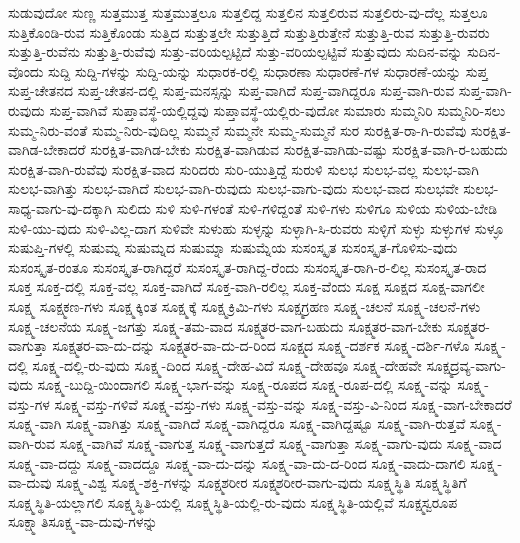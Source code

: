 {ಸುಡುವುದೋ
ಸುಣ್ಣ
ಸುತ್ತಮುತ್ತ
ಸುತ್ತಮುತ್ತಲೂ
ಸುತ್ತಲಿದ್ದ
ಸುತ್ತಲಿನ
ಸುತ್ತಲಿರುವ
ಸುತ್ತಲಿರು-ವು-ದೆಲ್ಲ
ಸುತ್ತಲೂ
ಸುತ್ತಿಕೊಂಡಿ-ರುವ
ಸುತ್ತಿಕೊಂಡು
ಸುತ್ತಿದ
ಸುತ್ತುತ್ತಲೇ
ಸುತ್ತುತ್ತಿದೆ
ಸುತ್ತುತ್ತಿರುತ್ತೇನೆ
ಸುತ್ತುತ್ತಿ-ರುವ
ಸುತ್ತುತ್ತಿ-ರುವರು
ಸುತ್ತುತ್ತಿ-ರುವೆನು
ಸುತ್ತುತ್ತಿ-ರುವೆವು
ಸುತ್ತು-ವರಿಯಲ್ಪಟ್ಟಿದೆ
ಸುತ್ತು-ವರಿಯಲ್ಪಟ್ಟಿವೆ
ಸುತ್ತುವುದು
ಸುದಿನ-ವನ್ನು
ಸುದಿನ-ವೊಂದು
ಸುದ್ದಿ
ಸುದ್ದಿ-ಗಳನ್ನು
ಸುದ್ದಿ-ಯನ್ನು
ಸುಧಾರಕ-ರಲ್ಲಿ
ಸುಧಾರಣಾ
ಸುಧಾರಣೆ-ಗಳ
ಸುಧಾರಣೆ-ಯನ್ನು
ಸುಪ್ತ
ಸುಪ್ತ-ಚೇತನದ
ಸುಪ್ತ-ಚೇತನ-ದಲ್ಲಿ
ಸುಪ್ತ-ಮನಸ್ಸನ್ನು
ಸುಪ್ತ-ವಾಗಿದೆ
ಸುಪ್ತ-ವಾಗಿದ್ದರೂ
ಸುಪ್ತ-ವಾಗಿ-ರುವ
ಸುಪ್ತ-ವಾಗಿ-ರುವುದು
ಸುಪ್ತ-ವಾಗಿವೆ
ಸುಪ್ತಾವಸ್ಥೆ-ಯಲ್ಲಿದ್ದವು
ಸುಪ್ತಾವಸ್ಥೆ-ಯಲ್ಲಿರು-ವುದೋ
ಸುಮಾರು
ಸುಮ್ಮನಿರಿ
ಸುಮ್ಮನಿರಿ-ಸಲು
ಸುಮ್ಮ-ನಿರು-ವಂತೆ
ಸುಮ್ಮ-ನಿರು-ವುದಿಲ್ಲ
ಸುಮ್ಮನೆ
ಸುಮ್ಮನೇ
ಸುಮ್ಮ-ಸುಮ್ಮನೆ
ಸುರ
ಸುರಕ್ಷಿತ-ರಾ-ಗಿ-ರುವೆವು
ಸುರಕ್ಷಿತ-ವಾಗಿಡ-ಬೇಕಾದರೆ
ಸುರಕ್ಷಿತ-ವಾಗಿಡ-ಬೇಕು
ಸುರಕ್ಷಿತ-ವಾಗಿಡುವ
ಸುರಕ್ಷಿತ-ವಾಗಿಡು-ವಷ್ಟು
ಸುರಕ್ಷಿತ-ವಾಗಿ-ರ-ಬಹುದು
ಸುರಕ್ಷಿತ-ವಾಗಿ-ರುವೆವು
ಸುರಕ್ಷಿತ-ವಾದ
ಸುರಿದರು
ಸುರಿ-ಯುತ್ತಿದ್ದೆ
ಸುರುಳಿ
ಸುಲಭ
ಸುಲಭ-ವಲ್ಲ
ಸುಲಭ-ವಾಗಿ
ಸುಲಭ-ವಾಗಿತ್ತು
ಸುಲಭ-ವಾಗಿದೆ
ಸುಲಭ-ವಾಗಿ-ರುವುದು
ಸುಲಭ-ವಾಗು-ವುದು
ಸುಲಭ-ವಾದ
ಸುಲಭವೇ
ಸುಲಭ-ಸಾಧ್ಯ-ವಾಗು-ವು-ದಕ್ಕಾಗಿ
ಸುಲಿದು
ಸುಳಿ
ಸುಳಿ-ಗಳಂತೆ
ಸುಳಿ-ಗಳಿದ್ದಂತೆ
ಸುಳಿ-ಗಳು
ಸುಳಿಗೂ
ಸುಳಿಯ
ಸುಳಿಯ-ಬೇಡಿ
ಸುಳಿ-ಯು-ವುದು
ಸುಳಿ-ವಿಲ್ಲ-ದಾಗ
ಸುಳಿವೇ
ಸುಳುಹು
ಸುಳ್ಳನ್ನು
ಸುಳ್ಳಾಗಿ-ಸಿ-ರುವರು
ಸುಳ್ಳಿಗೆ
ಸುಳ್ಳು
ಸುಳ್ಳುಗಳ
ಸುಳ್ಳೂ
ಸುಷುಪ್ತಿ-ಗಳಲ್ಲಿ
ಸುಷುಮ್ನ
ಸುಷುಮ್ನದ
ಸುಷುಮ್ನಾ
ಸುಷುಮ್ನೆಯ
ಸುಸಂಸ್ಕೃತ
ಸುಸಂಸ್ಕೃತ-ಗೊಳಿಸು-ವುದು
ಸುಸಂಸ್ಕೃತ-ರಂತೂ
ಸುಸಂಸ್ಕೃತ-ರಾಗಿದ್ದರೆ
ಸುಸಂಸ್ಕೃತ-ರಾಗಿದ್ದ-ರೆಂದು
ಸುಸಂಸ್ಕೃತ-ರಾಗಿ-ರ-ಲಿಲ್ಲ
ಸುಸಂಸ್ಕೃತ-ರಾದ
ಸೂಕ್ತ
ಸೂಕ್ತ-ದಲ್ಲಿ
ಸೂಕ್ತ-ವಲ್ಲ
ಸೂಕ್ತ-ವಾಗಿದೆ
ಸೂಕ್ತ-ವಾಗಿ-ರಲಿಲ್ಲ
ಸೂಕ್ತ-ವೆಂದು
ಸೂಕ್ಷ
ಸೂಕ್ಷದ
ಸೂಕ್ಷ-ವಾಗಲೀ
ಸೂಕ್ಷ್ಮ
ಸೂಕ್ಷ್ಮಕಣ-ಗಳು
ಸೂಕ್ಷ್ಮಕ್ಕಿಂತ
ಸೂಕ್ಷ್ಮಕ್ಕೆ
ಸೂಕ್ಷ್ಮಕ್ರಿಮಿ-ಗಳು
ಸೂಕ್ಷ್ಮಗ್ರಹಣ
ಸೂಕ್ಷ್ಮ-ಚಲನೆ
ಸೂಕ್ಷ್ಮ-ಚಲನೆ-ಗಳು
ಸೂಕ್ಷ್ಮ-ಚಲನೆಯ
ಸೂಕ್ಷ್ಮ-ಜಗತ್ತು
ಸೂಕ್ಷ್ಮ-ತಮ-ವಾದ
ಸೂಕ್ಷ್ಮತರ-ವಾಗ-ಬಹುದು
ಸೂಕ್ಷ್ಮತರ-ವಾಗ-ಬೇಕು
ಸೂಕ್ಷ್ಮತರ-ವಾಗುತ್ತಾ
ಸೂಕ್ಷ್ಮತರ-ವಾ-ದು-ದನ್ನು
ಸೂಕ್ಷ್ಮತರ-ವಾ-ದು-ದ-ರಿಂದ
ಸೂಕ್ಷ್ಮದ
ಸೂಕ್ಷ್ಮ-ದರ್ಶಕ
ಸೂಕ್ಷ್ಮ-ದರ್ಶಿ-ಗಳೊ
ಸೂಕ್ಷ್ಮ-ದಲ್ಲಿ
ಸೂಕ್ಷ್ಮ-ದಲ್ಲಿ-ರು-ವುದು
ಸೂಕ್ಷ್ಮ-ದಿಂದ
ಸೂಕ್ಷ್ಮ-ದೇಹ-ವಿದೆ
ಸೂಕ್ಷ್ಮ-ದೇಹವೂ
ಸೂಕ್ಷ್ಮ-ದೇಹವೇ
ಸೂಕ್ಷ್ಮದ್ರವ್ಯ-ವಾಗು-ವುದು
ಸೂಕ್ಷ್ಮ-ಬುದ್ದಿ-ಯಿಂದಾಗಲಿ
ಸೂಕ್ಷ್ಮ-ಭಾಗ-ವನ್ನು
ಸೂಕ್ಷ್ಮ-ರೂಪದ
ಸೂಕ್ಷ್ಮ-ರೂಪ-ದಲ್ಲಿ
ಸೂಕ್ಷ್ಮ-ವನ್ನು
ಸೂಕ್ಷ್ಮ-ವಸ್ತು-ಗಳ
ಸೂಕ್ಷ್ಮ-ವಸ್ತು-ಗಳಿವೆ
ಸೂಕ್ಷ್ಮ-ವಸ್ತು-ಗಳು
ಸೂಕ್ಷ್ಮ-ವಸ್ತು-ವನ್ನು
ಸೂಕ್ಷ್ಮ-ವಸ್ತು-ವಿ-ನಿಂದ
ಸೂಕ್ಷ್ಮ-ವಾಗ-ಬೇಕಾದರೆ
ಸೂಕ್ಷ್ಮ-ವಾಗಿ
ಸೂಕ್ಷ್ಮ-ವಾಗಿತ್ತು
ಸೂಕ್ಷ್ಮ-ವಾಗಿದೆ
ಸೂಕ್ಷ್ಮ-ವಾಗಿದ್ದರೂ
ಸೂಕ್ಷ್ಮ-ವಾಗಿದ್ದಷ್ಟೂ
ಸೂಕ್ಷ್ಮ-ವಾಗಿ-ರುತ್ತವೆ
ಸೂಕ್ಷ್ಮ-ವಾಗಿ-ರುವ
ಸೂಕ್ಷ್ಮ-ವಾಗಿವೆ
ಸೂಕ್ಷ್ಮ-ವಾಗುತ್ತ
ಸೂಕ್ಷ್ಮ-ವಾಗುತ್ತದೆ
ಸೂಕ್ಷ್ಮ-ವಾಗುತ್ತಾ
ಸೂಕ್ಷ್ಮ-ವಾಗು-ವುದು
ಸೂಕ್ಷ್ಮ-ವಾದ
ಸೂಕ್ಷ್ಮ-ವಾ-ದದ್ದು
ಸೂಕ್ಷ್ಮ-ವಾದದ್ದೂ
ಸೂಕ್ಷ್ಮ-ವಾ-ದು-ದನ್ನು
ಸೂಕ್ಷ್ಮ-ವಾ-ದು-ದ-ರಿಂದ
ಸೂಕ್ಷ್ಮ-ವಾದು-ದಾಗಲಿ
ಸೂಕ್ಷ್ಮ-ವಾ-ದುವು
ಸೂಕ್ಷ್ಮ-ವಿಶ್ವ
ಸೂಕ್ಷ್ಮ-ಶಕ್ತಿ-ಗಳನ್ನು
ಸೂಕ್ಷ್ಮಶರೀರ
ಸೂಕ್ಷ್ಮಶರೀರ-ವಾಗು-ವುದು
ಸೂಕ್ಷ್ಮಸ್ಥಿತಿ
ಸೂಕ್ಷ್ಮಸ್ಥಿತಿಗೆ
ಸೂಕ್ಷ್ಮಸ್ಥಿತಿ-ಯಲ್ಲಾಗಲಿ
ಸೂಕ್ಷ್ಮಸ್ಥಿತಿ-ಯಲ್ಲಿ
ಸೂಕ್ಷ್ಮಸ್ಥಿತಿ-ಯಲ್ಲಿ-ರು-ವುದು
ಸೂಕ್ಷ್ಮಸ್ಥಿತಿ-ಯಲ್ಲಿವೆ
ಸೂಕ್ಷ್ಮಸ್ವರೂಪ
ಸೂಕ್ಷ್ಮಾತಿಸೂಕ್ಷ್ಮ-ವಾ-ದುವು-ಗಳನ್ನು
}
